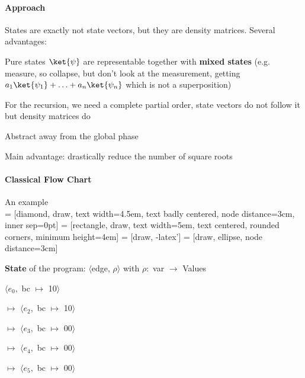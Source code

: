 \documentclass[10pt]{report}
\begin{document}
\paragraph{Approach} States are exactly not state vectors, but they are density matrices. Several advantages: \begin{list}{}{}
	\item Pure states $\ket{\psi}$ are representable together with \textbf{mixed states} (e.g. measure, so collapse, but don't look at the measurement, getting $a_1\ket{\psi_1}+\ldots+a_n\ket{\psi_n}$ which is not a superposition)
	\item For the recursion, we need a complete partial order, state vectors do not follow it but density matrices do
	\item Abstract away from the global phase
	\item Main advantage: drastically reduce the number of square roots
\end{list} 
\pagebreak
\paragraph{Classical Flow Chart} An example\\
 = [diamond, draw, 
    text width=4.5em, text badly centered, node distance=3cm, inner sep=0pt]
 = [rectangle, draw, 
    text width=5em, text centered, rounded corners, minimum height=4em]
 = [draw, -latex']
 = [draw, ellipse, node distance=3cm]
\begin{multicols}{2}
\textbf{State} of the program: $\langle$edge, $\rho\rangle$ with $\rho:$ var $\rightarrow$ Values
\begin{list}{}{}
	\item $\langle e_0,$ bc $\mapsto$ 10$\rangle$
	\item[$\mapsto$] $\langle e_2,$ bc $\mapsto$ 10$\rangle$
	\item[$\mapsto$] $\langle e_3,$ bc $\mapsto$ 00$\rangle$
	\item[$\mapsto$] $\langle e_4,$ bc $\mapsto$ 00$\rangle$
	\item[$\mapsto$] $\langle e_5,$ bc $\mapsto$ 00$\rangle$
\end{list}
\columnbreak
\begin{center}
\end{center}
\end{multicols}
\end{document}
